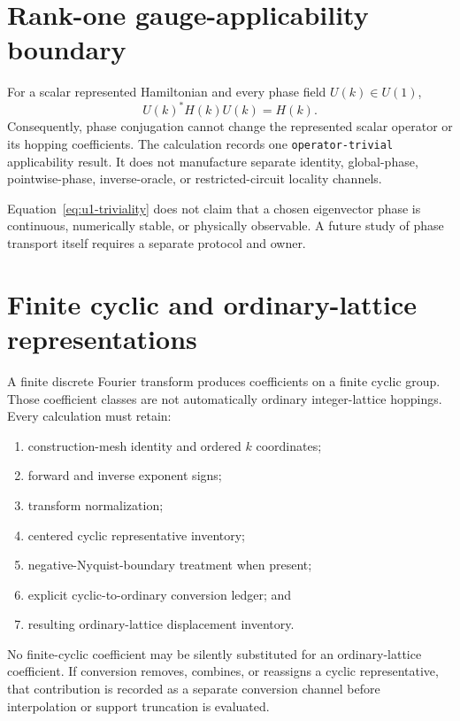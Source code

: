 \documentclass[11pt]{article}
\begin{document}
\section{Rank-one gauge-applicability boundary}

For a scalar represented Hamiltonian and every phase field $U(k)\in U(1)$,
\begin{equation}
  U(k)^{*}H(k)U(k)=H(k).
  \label{eq:u1-triviality}
\end{equation}
Consequently, phase conjugation cannot change the represented scalar operator or its
hopping coefficients.  The calculation records one \texttt{operator-trivial}
applicability result.  It does not manufacture separate identity, global-phase,
pointwise-phase, inverse-oracle, or restricted-circuit locality channels.

Equation~\eqref{eq:u1-triviality} does not claim that a chosen eigenvector phase is
continuous, numerically stable, or physically observable.  A future study of phase
transport itself requires a separate protocol and owner.

\section{Finite cyclic and ordinary-lattice representations}

A finite discrete Fourier transform produces coefficients on a finite cyclic group.
Those coefficient classes are not automatically ordinary integer-lattice hoppings.
Every calculation must retain:
\begin{enumerate}[leftmargin=*]
  \item construction-mesh identity and ordered $k$ coordinates;
  \item forward and inverse exponent signs;
  \item transform normalization;
  \item centered cyclic representative inventory;
  \item negative-Nyquist-boundary treatment when present;
  \item explicit cyclic-to-ordinary conversion ledger; and
  \item resulting ordinary-lattice displacement inventory.
\end{enumerate}

No finite-cyclic coefficient may be silently substituted for an ordinary-lattice
coefficient.  If conversion removes, combines, or reassigns a cyclic representative,
that contribution is recorded as a separate conversion channel before interpolation or
support truncation is evaluated.
\end{document}
